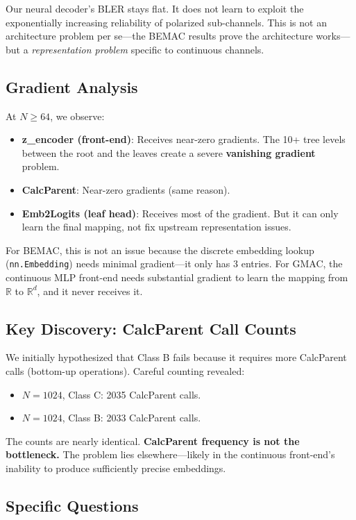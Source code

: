 \documentclass[10pt]{article}
\begin{document}
Our neural decoder's BLER stays flat. It does not learn to exploit the exponentially increasing reliability of polarized sub-channels. This is not an architecture problem per se---the BEMAC results prove the architecture works---but a \emph{representation problem} specific to continuous channels.

\subsection{Gradient Analysis}

At $N \ge 64$, we observe:
\begin{itemize}[nosep]
    \item \textbf{z\_encoder (front-end)}: Receives near-zero gradients. The 10+ tree levels between the root and the leaves create a severe \textbf{vanishing gradient} problem.
    \item \textbf{CalcParent}: Near-zero gradients (same reason).
    \item \textbf{Emb2Logits (leaf head)}: Receives most of the gradient. But it can only learn the final mapping, not fix upstream representation issues.
\end{itemize}

For BEMAC, this is not an issue because the discrete embedding lookup (\texttt{nn.Embedding}) needs minimal gradient---it only has 3 entries. For GMAC, the continuous MLP front-end needs substantial gradient to learn the mapping from $\mathbb{R}$ to $\mathbb{R}^d$, and it never receives it.

\subsection{Key Discovery: CalcParent Call Counts}

We initially hypothesized that Class B fails because it requires more CalcParent calls (bottom-up operations). Careful counting revealed:
\begin{itemize}[nosep]
    \item $N = 1024$, Class C: 2035 CalcParent calls.
    \item $N = 1024$, Class B: 2033 CalcParent calls.
\end{itemize}
The counts are nearly identical. \textbf{CalcParent frequency is not the bottleneck.} The problem lies elsewhere---likely in the continuous front-end's inability to produce sufficiently precise embeddings.

\subsection{Specific Questions}
\end{document}
